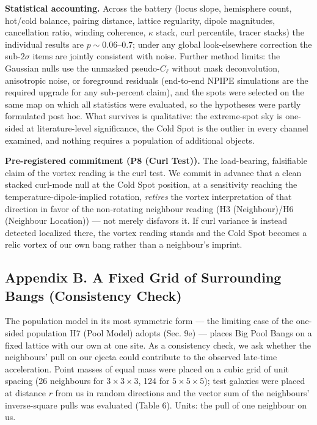 \documentclass[
]{article}
\begin{document}
\textbf{Statistical accounting.} Across the battery (locus slope,
hemisphere count, hot/cold balance, pairing distance, lattice
regularity, dipole magnitudes, cancellation ratio, winding coherence,
\(\kappa\) stack, curl percentile, tracer stacks) the individual results
are \(p \sim 0.06\)--\(0.7\); under any global look-elsewhere correction
the sub-\(2\sigma\) items are jointly consistent with noise. Further
method limits: the Gaussian nulls use the unmasked pseudo-\(C_\ell\)
without mask deconvolution, anisotropic noise, or foreground residuals
(end-to-end NPIPE simulations are the required upgrade for any
sub-percent claim), and the spots were selected on the same map on which
all statistics were evaluated, so the hypotheses were partly formulated
post hoc. What survives is qualitative: the extreme-spot sky is
one-sided at literature-level significance, the Cold Spot is the outlier
in every channel examined, and nothing requires a population of
additional objects.

\textbf{Pre-registered commitment (P8 (Curl Test)).} The load-bearing,
falsifiable claim of the vortex reading is the curl test. We commit in
advance that a clean stacked curl-mode null at the Cold Spot position,
at a sensitivity reaching the temperature-dipole-implied rotation,
\emph{retires} the vortex interpretation of that direction in favor of
the non-rotating neighbour reading (H3 (Neighbour)/H6 (Neighbour
Location)) --- not merely disfavors it. If curl variance is instead
detected localized there, the vortex reading stands and the Cold Spot
becomes a relic vortex of our own bang rather than a neighbour's
imprint.

\hypertarget{appendix-b.-a-fixed-grid-of-surrounding-bangs-consistency-check}{%
\subsection{\texorpdfstring{\textbf{Appendix B. A Fixed Grid of
Surrounding Bangs (Consistency
Check)}}{Appendix B. A Fixed Grid of Surrounding Bangs (Consistency Check)}}\label{appendix-b.-a-fixed-grid-of-surrounding-bangs-consistency-check}}

The population model in its most symmetric form --- the limiting case of
the one-sided population H7 (Pool Model) adopts (Sec. 9e) --- places Big
Pool Bangs on a fixed lattice with our own at one site. As a consistency
check, we ask whether the neighbours' pull on our ejecta could
contribute to the observed late-time acceleration. Point masses of equal
mass were placed on a cubic grid of unit spacing (26 neighbours for
\(3\times3\times3\), 124 for \(5\times5\times5\)); test galaxies were
placed at distance \(r\) from us in random directions and the vector sum
of the neighbours' inverse-square pulls was evaluated (Table 6). Units:
the pull of one neighbour on us.
\end{document}
